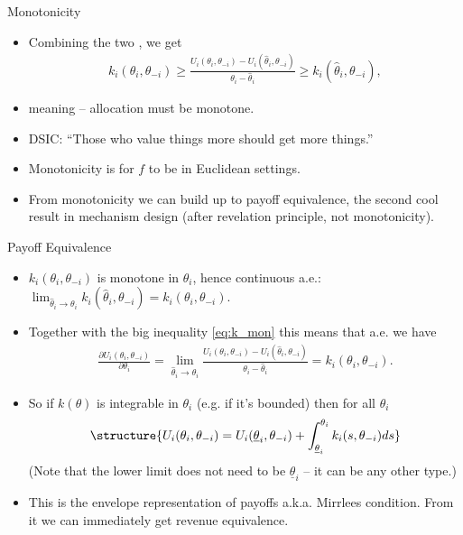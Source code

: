 \documentclass[english,10pt
,aspectratio=169
,handout
]{beamer}
\begin{document}
\begin{frame}{Monotonicity}
\begin{itemize}
	\item Combining the two , we get
	{\small \vspace{-0.5em}\begin{align}
		\label{eq:k_mon}
			k_i(\theta_i,\theta_{-i}) 
			\geq 
			\frac{ U_i(\theta_i, \theta_{-i}) - U_i(\hat{\theta}_i, \theta_{-i}) }{ \theta_i - \hat{\theta}_i } 
			\geq 
			k_i(\hat{\theta}_i,\theta_{-i}),
		\end{align}\vspace{-1em}}
	\pause
	\item meaning  -- allocation must be \alert{monotone}.
	\item DSIC: ``Those who value things more should get more things.''
	\item \alert{Monotonicity} is  for $f$ to be  in \alert{Euclidean} settings.
	\item From monotonicity we can build up to \alert{payoff equivalence}, 
	the second cool result in mechanism design (after revelation principle, not monotonicity).
\end{itemize}
\end{frame}


\begin{frame}{Payoff Equivalence}
\begin{itemize}
	\item $k_i(\theta_i,\theta_{-i})$ is monotone in $\theta_i$, hence continuous a.e.: $\lim_{\hat{\theta}_i \to \theta_i} k_i(\hat{\theta}_i,\theta_{-i}) = k_i(\theta_i,\theta_{-i})$.
	\pause
	\item Together with the big inequality \eqref{eq:k_mon}	this means that a.e. we have
	\pause
	\begin{align*}
		\frac{\partial U_i(\theta_i,\theta_{-i})}{\partial \theta_i} = \lim_{\hat{\theta}_i \to \theta_i} \frac{ U_i(\theta_i, \theta_{-i}) - U_i(\hat{\theta}_i, \theta_{-i}) }{ \theta_i - \hat{\theta}_i }  = k_i(\theta_i,\theta_{-i}).
	\end{align*}
	\pause
	\item So if $k(\theta)$ is integrable in $\theta_i$ (e.g. if it's bounded) then for all $\theta_i$
	\begin{align*}
	\structure{
		U_i(\theta_i, \theta_{-i}) = U_i (\underline{\theta}_i,\theta_{-i}) + \int_{\underline{\theta}_i}^{\theta_i} k_i(s,\theta_{-i}) d s
	}
	\end{align*}
	(Note that the lower limit does not need to be $\underline{\theta}_i$ -- it can be any other type.)
	\item This is the \alert{envelope representation of payoffs} a.k.a. Mirrlees condition. From it we can immediately get revenue equivalence.
\end{itemize}
\end{frame}
\end{document}
